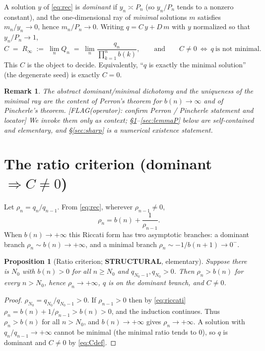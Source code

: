 \documentclass[11pt]{article}
\newtheorem{proposition}{Proposition}
\newtheorem{remark}{Remark}
\newcommand{\Rinf}{R_\infty}
\newcommand{\flag}[1]{{\color{red}\textsf{[FLAG(operator): #1]}}}
\begin{document}
A solution $y$ of \eqref{eq:rec} is \emph{dominant} if $y_n\asymp P_n$ (so
$y_n/P_n$ tends to a nonzero constant), and the one-dimensional ray of
\emph{minimal} solutions $m$ satisfies $m_n/y_n\to0$, hence $m_n/P_n\to0$. Writing
$q=C\,y+D\,m$ with $y$ normalized so that $y_n/P_n\to1$,
\begin{equation}\label{eq:Cdef}
  C\;=\;\Rinf\;:=\;\lim_n Q_n\;=\;\lim_n\frac{q_n}{\prod_{k=1}^n b(k)},
  \qquad\text{and}\qquad
  C\neq0\ \Longleftrightarrow\ q\ \text{is not minimal}.
\end{equation}
This $C$ is the object to decide. Equivalently, ``$q$ is exactly the minimal
solution'' (the degenerate seed) is exactly $C=0$.

\begin{remark}
The abstract dominant/minimal dichotomy and the uniqueness of the minimal ray are
the content of Perron's theorem for $b(n)\to\infty$ and of Pincherle's theorem.
\flag{confirm Perron / Pincherle statement and locator} We invoke them only as
context; \S\ref{sec:ratio}--\ref{sec:lemmaP} below are self-contained and
elementary, and \S\ref{sec:sharp} is a numerical existence statement.
\end{remark}

\section{The ratio criterion (dominant $\Rightarrow C\neq0$)}\label{sec:ratio}

Let $\rho_n=q_n/q_{n-1}$. From \eqref{eq:rec}, wherever $\rho_{n-1}\neq0$,
\begin{equation}\label{eq:riccati}
  \rho_n=b(n)+\frac{1}{\rho_{n-1}}.
\end{equation}
When $b(n)\to+\infty$ this Riccati form has two asymptotic branches: a dominant
branch $\rho_n\sim b(n)\to+\infty$, and a minimal branch
$\rho_n\sim-1/b(n+1)\to0^-$.

\begin{proposition}[Ratio criterion; \textbf{STRUCTURAL}, elementary]\label{prop:ratio}
Suppose there is $N_0$ with $b(n)>0$ for all $n\ge N_0$ and $q_{N_0-1},q_{N_0}>0$.
Then $\rho_n>b(n)$ for every $n>N_0$, hence $\rho_n\to+\infty$, $q$ is on the
dominant branch, and $C\neq0$.
\end{proposition}

\begin{proof}
$\rho_{N_0}=q_{N_0}/q_{N_0-1}>0$. If $\rho_{n-1}>0$ then by \eqref{eq:riccati}
$\rho_n=b(n)+1/\rho_{n-1}>b(n)>0$, and the induction continues. Thus $\rho_n>b(n)$
for all $n>N_0$, and $b(n)\to+\infty$ gives $\rho_n\to+\infty$. A solution with
$q_n/q_{n-1}\to+\infty$ cannot be minimal (the minimal ratio tends to $0$), so $q$
is dominant and $C\neq0$ by \eqref{eq:Cdef}.
\end{proof}
\end{document}
